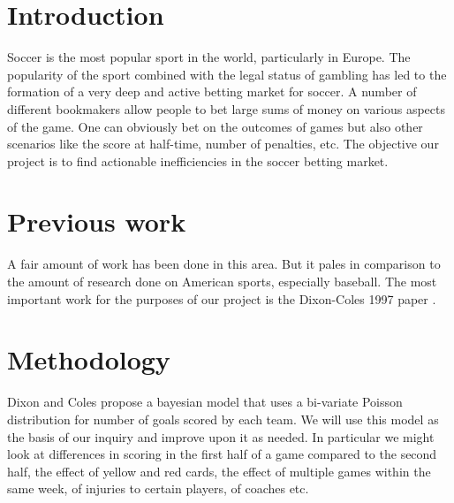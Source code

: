 \documentclass[12pt]{article}
\begin{document}
\maketitle


\section{Introduction}
Soccer is the most popular sport in the world, particularly in Europe. The 
popularity of the sport combined with the legal status of gambling has led
to the formation of a very deep and active betting market for soccer. A
number of different bookmakers allow people to bet large sums of money 
on various aspects of the game. One can obviously bet on the outcomes
of games but also other scenarios like the score at half-time, number of 
penalties, etc. The objective our project is to find actionable inefficiencies in the 
soccer betting market. 


\section{Previous work}\label{previous work}
A fair amount of work has been done in this area. But it pales in comparison
to the amount of research done on American sports, especially baseball.
The most important work for the purposes of our project is the Dixon-Coles
1997 paper \cite{dixoncoles}. 

\section{Methodology}\label{methodology}
Dixon and Coles propose a bayesian model that uses a bi-variate Poisson 
distribution for number of goals scored by each team. We will use this model 
as the basis of our inquiry and improve upon it as needed. In particular we might 
look at  differences in scoring in the first half of a game compared to the second half, 
the effect of yellow and red cards, the effect of multiple games within the same
week, of injuries to certain players, of coaches etc.
\end{document}
